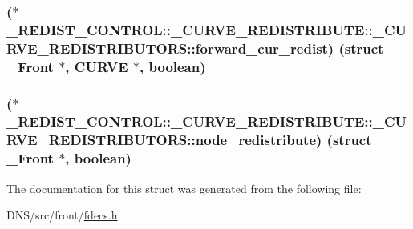 \subsubsection[{\texorpdfstring{forward\+\_\+cur\+\_\+redist}{forward_cur_redist}}]{($\ast$ \+\_\+\+R\+E\+D\+I\+S\+T\+\_\+\+C\+O\+N\+T\+R\+O\+L\+::\+\_\+\+C\+U\+R\+V\+E\+\_\+\+R\+E\+D\+I\+S\+T\+R\+I\+B\+U\+T\+E\+::\+\_\+\+C\+U\+R\+V\+E\+\_\+\+R\+E\+D\+I\+S\+T\+R\+I\+B\+U\+T\+O\+R\+S\+::forward\+\_\+cur\+\_\+redist) (struct {\bf \+\_\+\+Front} $\ast$, {\bf C\+U\+R\+VE} $\ast$, {\bf boolean})}\hypertarget{struct___r_e_d_i_s_t___c_o_n_t_r_o_l_1_1___c_u_r_v_e___r_e_d_i_s_t_r_i_b_u_t_e_1_1___c_u_r_v_e___r_e_d_i_s_t_r_i_b_u_t_o_r_s_a11258d2c4a0fe7e91ff7f6b6ce26d32a}{}\label{struct___r_e_d_i_s_t___c_o_n_t_r_o_l_1_1___c_u_r_v_e___r_e_d_i_s_t_r_i_b_u_t_e_1_1___c_u_r_v_e___r_e_d_i_s_t_r_i_b_u_t_o_r_s_a11258d2c4a0fe7e91ff7f6b6ce26d32a}
\subsubsection[{\texorpdfstring{node\+\_\+redistribute}{node_redistribute}}]{($\ast$ \+\_\+\+R\+E\+D\+I\+S\+T\+\_\+\+C\+O\+N\+T\+R\+O\+L\+::\+\_\+\+C\+U\+R\+V\+E\+\_\+\+R\+E\+D\+I\+S\+T\+R\+I\+B\+U\+T\+E\+::\+\_\+\+C\+U\+R\+V\+E\+\_\+\+R\+E\+D\+I\+S\+T\+R\+I\+B\+U\+T\+O\+R\+S\+::node\+\_\+redistribute) (struct {\bf \+\_\+\+Front} $\ast$, {\bf boolean})}\hypertarget{struct___r_e_d_i_s_t___c_o_n_t_r_o_l_1_1___c_u_r_v_e___r_e_d_i_s_t_r_i_b_u_t_e_1_1___c_u_r_v_e___r_e_d_i_s_t_r_i_b_u_t_o_r_s_a78984ecf2acb0988554b7cb261daf43f}{}\label{struct___r_e_d_i_s_t___c_o_n_t_r_o_l_1_1___c_u_r_v_e___r_e_d_i_s_t_r_i_b_u_t_e_1_1___c_u_r_v_e___r_e_d_i_s_t_r_i_b_u_t_o_r_s_a78984ecf2acb0988554b7cb261daf43f}


The documentation for this struct was generated from the following file\+:\begin{DoxyCompactItemize}
\item 
D\+N\+S/src/front/\hyperlink{fdecs_8h}{fdecs.\+h}\end{DoxyCompactItemize}

